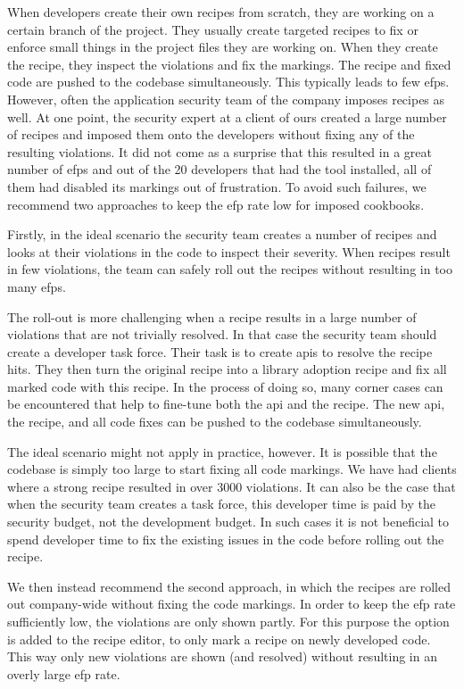 When developers create their own recipes from scratch, they are working on a certain branch of the project.
They usually create targeted recipes to fix or enforce small things in the project files they are working on.
When they create the recipe, they inspect the violations and fix the markings.
The recipe and fixed code are pushed to the codebase simultaneously.
This typically leads to few \glspl{efp}.
However, often the application security team of the company imposes recipes as well.
At one point, the security expert at a client of ours created a large number of recipes and imposed them onto the developers without fixing any of the resulting violations.
It did not come as a surprise that this resulted in a great number of \glspl{efp} and out of the 20 developers that had the tool installed, all of them had disabled its markings out of frustration.
To avoid such failures, we recommend two approaches to keep the \gls{efp} rate low for imposed cookbooks.

Firstly, in the ideal scenario the security team creates a number of recipes and looks at their violations in the code to inspect their severity.
When recipes result in few violations, the team can safely roll out the recipes without resulting in too many \glspl{efp}.

The roll-out is more challenging when a recipe results in a large number of violations that are not trivially resolved.
In that case the security team should create a developer task force.
Their task is to create \glspl{api} to resolve the recipe hits.
They then turn the original recipe into a library adoption recipe and fix all marked code with this recipe.
In the process of doing so, many corner cases can be encountered that help to fine-tune both the \gls{api} and the recipe.
The new \gls{api}, the recipe, and all code fixes can be pushed to the codebase simultaneously. 

The ideal scenario might not apply in practice, however.
It is possible that the codebase is simply too large to start fixing all code markings.
We have had clients where a strong recipe resulted in over 3000 violations.
It can also be the case that when the security team creates a task force, this developer time is paid by the security budget, not the development budget.
In such cases it is not beneficial to spend developer time to fix the existing issues in the code before rolling out the recipe. 

We then instead recommend the second approach, in which the recipes are rolled out company-wide without fixing the code markings.
In order to keep the \gls{efp} rate sufficiently low, the violations are only shown partly.
For this purpose the option is added to the recipe editor, to only mark a recipe on newly developed code.
This way only new violations are shown (and resolved) without resulting in an overly large \gls{efp} rate.